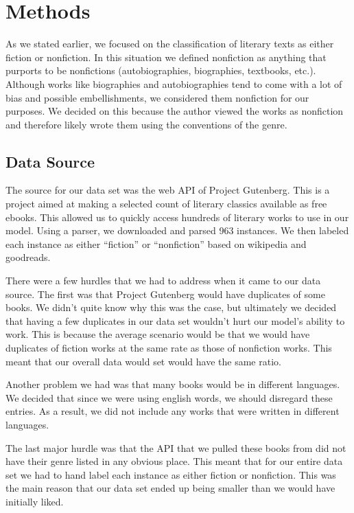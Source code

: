 \documentclass{article}
\begin{document}
\pagebreak

\section{Methods}

As we stated earlier, we focused on the classification of literary texts as either fiction or nonfiction. In this situation we defined nonfiction as anything that purports to be nonfictions (autobiographies, biographies, textbooks, etc.). Although works like biographies and autobiographies tend to come with a lot of bias and possible embellishments, we considered them nonfiction for our purposes. We decided on this because the author viewed the works as nonfiction and therefore likely wrote them using the conventions of the genre.

\subsection{Data Source}

The source for our data set was the web API of Project Gutenberg. This is a project aimed at making a selected count of literary classics available as free ebooks. This allowed us to quickly access hundreds of literary works to use in our model. Using a parser, we downloaded and parsed 963 instances. We then labeled each instance as either “fiction” or “nonfiction” based on wikipedia and goodreads.\par
There were a few hurdles that we had to address when it came to our data source. The first was that Project Gutenberg would have duplicates of some books. We didn’t quite know why this was the case, but ultimately we decided that having a few duplicates in our data set wouldn’t hurt our model’s ability to work. This is because the average scenario would be that we would have duplicates of fiction works at the same rate as those of nonfiction works. This meant that our overall data would set would have the same ratio.\par
Another problem we had was that many books would be in different languages. We decided that since we were using english words, we should disregard these entries. As a result, we did not include any works that were written in different languages.\par
The last major hurdle was that the API that we pulled these books from did not have their genre listed in any obvious place. This meant that for our entire data set we had to hand label each instance as either fiction or nonfiction. This was the main reason that our data set ended up being smaller than we would have initially liked.
\end{document}
